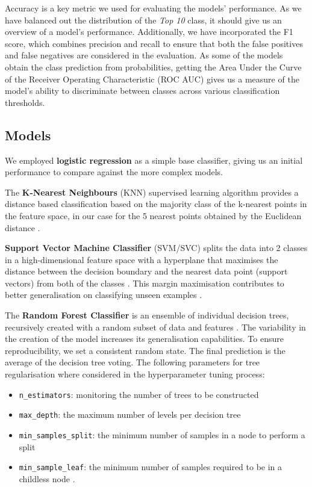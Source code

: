 \documentclass{article}
\begin{document}
Accuracy is a key metric we used for evaluating the models’ performance. As we have balanced out the distribution of the \textit{Top 10} class, it should give us an overview of a model’s performance. Additionally, we have incorporated the F1 score, which combines precision and recall to ensure that both the false positives and false negatives are considered in the evaluation. As some of the models obtain the class prediction from probabilities, getting the Area Under the Curve of the Receiver Operating Characteristic (ROC AUC) gives us a measure of the model's ability to discriminate between classes across various classification thresholds. 

\subsection{Models}
We employed \textbf{logistic regression} as a simple base classifier, giving us an initial performance to compare against the more complex models. 

The \textbf{K-Nearest Neighbours} (KNN) supervised learning algorithm provides a distance based classification based on the majority class of the k-nearest points in the feature space, in our case for the 5 nearest points obtained by the Euclidean distance \cite{knn}. 

\textbf{Support Vector Machine Classifier} (SVM/SVC) splits the data into 2 classes in a high-dimensional feature space with a hyperplane that maximises the distance between the decision boundary and the nearest data point (support vectors) from both of the classes \cite{svm1}. This margin maximisation contributes to better generalisation on classifying unseen examples \cite{svm}. 

The \textbf{Random Forest Classifier} is an ensemble of individual decision trees, recursively created with a random subset of data and features \cite{inbook}. The variability in the creation of the model increases its generalisation capabilities. To ensure reproducibility, we set a consistent random state. The final prediction is the average of the decision tree voting. The following parameters for tree regularisation where considered in the hyperparameter tuning process:
\begin{itemize}
  \item \texttt{{n\_estimators}}: monitoring the number of trees to be constructed
  \item \texttt{{max\_depth}}: the maximum number of levels per decision tree
  \item \texttt{{min\_samples\_split}}: the minimum number of samples in a node to perform a split
  \item \texttt{{min\_sample\_leaf}}: the minimum number of samples required to be in a childless node \cite{rf_docu}. 
\end{itemize}
\end{document}
